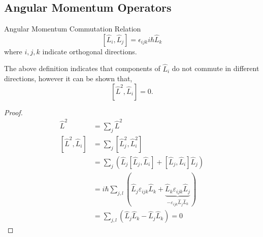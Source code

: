 \documentclass{book}
\begin{document}
\subsection{Angular Momentum Operators}
\begin{Definitions}{Angular Momentum Commutation Relation}{}
	\begin{equation}
		\left[\hat{L}_i, \hat{L}_j\right] = \epsilon_{ijk}i\hbar\hat{L}_k
	\end{equation}
	where $i,j,k$ indicate orthogonal directions.
\end{Definitions}
The above definition indicates that components of $\hat{L}_i$ do not commute in different directions, however it can be shown that,
\begin{equation}
	\left[\hat{L}^2,\hat{L}_i\right] = 0.
\end{equation}
\begin{proof}
	\begin{equation}
		\begin{split}
			\hat{L}^2 &= \sum_j \hat{L}^2 \\
			\left[\hat{L}^2,\hat{L}_i\right] & =\sum_j\left[\hat{L}_j^2, \hat{L}_i^2\right] \\
			& = \sum_j \left(\hat{L}_j\left[\hat{L}_j,\hat{L}_i\right] + \left[\hat{L}_j,\hat{L}_i\right]\hat{L}_j \right)\\
			& = i\hbar \sum_{j,l}\left(\hat{L}_j\varepsilon_{ijk}\hat{L}_k + \underbrace{\hat{L}_k \varepsilon_{ijk}\hat{L}_j}_{-\varepsilon_{ijk}\hat{L}_j\hat{L}_k}\right) \\
			& = \sum_{j,l} \left(\hat{L}_j\hat{L}_k - \hat{L}_j\hat{L}_k\right) = 0
		\end{split}
	\end{equation}	
\end{proof}
\end{document}
